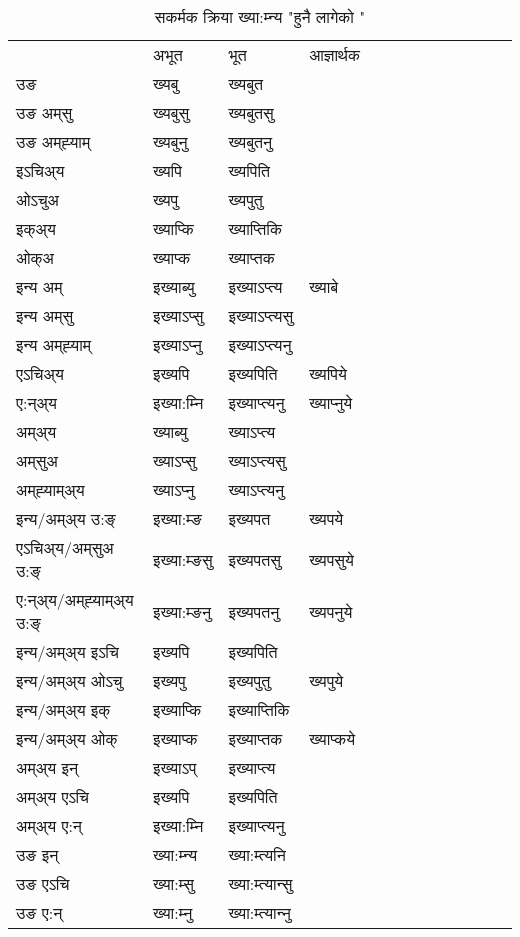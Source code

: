 \begin{table}[H]
\centering
\caption{\label{ɛp.vt} सकर्मक क्रिया  ख्या:म्‍न्य  "हुनै लागेको "  }
\begin{tabular}{l|l|l|l|l|l|l|l|l|l|l|l|l}  \toprule
&अभूत & भूत & आज्ञार्थक \\ 
उङ &ख्यबु &ख्यबुत \\ 
उङ अम्‌सु &ख्यबुसु &ख्यबुतसु \\ 
उङ अम्‌ह्‍याम् &ख्यबुनु &ख्यबुतनु \\ 
इऽचिअ्य &ख्यपि &ख्यपिति   \\ 
ओऽचुअ &ख्यपु &ख्यपुतु   \\ 
इक्अ्य &ख्याप्कि &ख्याप्‍तिकि   \\ 
ओक्अ &ख्याप्क &ख्याप्‍तक   \\ 
इन्य अम् & इख्याब्यु  & इख्याऽप्‍त्य &ख्याबे  \\ 
इन्य अम्‌सु & इख्याऽप्सु  & इख्याऽप्‍त्यसु   \\ 
इन्य अम्‌ह्‍याम् & इख्याऽप्‍नु  & इख्याऽप्‍त्यनु   \\ 
एऽचिअ्य & इख्यपि & इख्यपिति &ख्यपिये    \\ 
ए:न्अ्य & इख्या:म्‍नि  & इख्याप्‍त्यनु &ख्याप्‍नुये  \\ 
अम्अ्य & ख्याब्यु  & ख्याऽप्‍त्य  \\ 
अम्‌सुअ & ख्याऽप्सु & ख्याऽप्‍त्यसु  \\ 
अम्‌ह्‍याम्अ्य & ख्याऽप्‍नु  & ख्याऽप्‍त्यनु \\ 
\midrule
इन्य/अम्अ्य उ:ङ्‌&इख्या:म्ङ & इख्यपत &ख्यपये \\ 
एऽचिअ्य/अम्‌सुअ उ:ङ्‌ &इख्या:म्ङसु & इख्यपतसु &ख्यपसुये \\ 
ए:न्अ्य/अम्‌ह्‍याम्अ्य उ:ङ्‌ &इख्या:म्ङनु & इख्यपतनु &ख्यपनुये \\ 
इन्य/अम्अ्य इऽचि & इख्यपि & इख्यपिति    \\ 
इन्य/अम्अ्य ओऽचु & इख्यपु & इख्यपुतु  &ख्यपुये  \\ 
इन्य/अम्अ्य इक् & इख्याप्कि & इख्याप्‍तिकि   \\ 
इन्य/अम्अ्य ओक् & इख्याप्क & इख्याप्‍तक  &ख्याप्कये  \\ 
अम्अ्य इन् & इख्याऽप् & इख्याप्‍त्य   \\ 
अम्अ्य एऽचि & इख्यपि & इख्यपिति    \\ 
अम्अ्य ए:न् & इख्या:म्‍नि  & इख्याप्‍त्यनु  \\ 
\midrule
उङ इन् & ख्या:म्‍न्य  & ख्या:म्त्यनि  \\ 
उङ एऽचि & ख्या:म्सु  & ख्या:म्त्यान्सु   \\ 
उङ ए:न्& ख्या:म्‍नु  & ख्या:म्त्यान्‍नु   \\ 
\bottomrule
\end{tabular}
\end{table}


